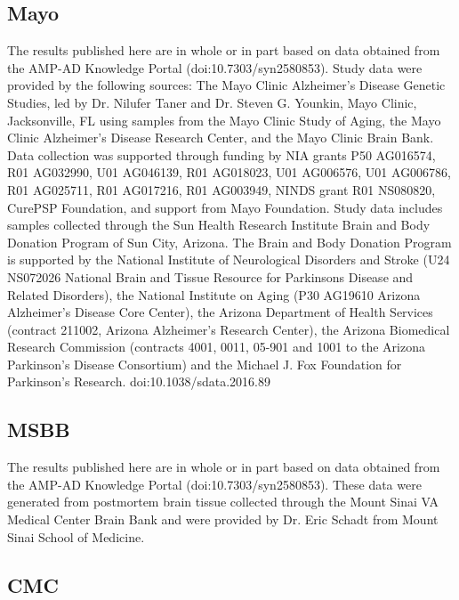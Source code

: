 \subsection*{Mayo}

The results published here are in whole or in part based on data obtained from the AMP-AD Knowledge Portal (doi:10.7303/syn2580853). Study data were provided by the following sources: The Mayo Clinic Alzheimer’s Disease Genetic Studies, led by Dr. Nilufer Taner and Dr. Steven G. Younkin, Mayo Clinic, Jacksonville, FL using samples from the Mayo Clinic Study of Aging, the Mayo Clinic Alzheimer’s Disease Research Center, and the Mayo Clinic Brain Bank. Data collection was supported through funding by NIA grants P50 AG016574, R01 AG032990, U01 AG046139, R01 AG018023, U01 AG006576, U01 AG006786, R01 AG025711, R01 AG017216, R01 AG003949, NINDS grant R01 NS080820, CurePSP Foundation, and support from Mayo Foundation. Study data includes samples collected through the Sun Health Research Institute Brain and Body Donation Program of Sun City, Arizona. The Brain and Body Donation Program is supported by the National Institute of Neurological Disorders and Stroke (U24 NS072026 National Brain and Tissue Resource for Parkinsons Disease and Related Disorders), the National Institute on Aging (P30 AG19610 Arizona Alzheimer’s Disease Core Center), the Arizona Department of Health Services (contract 211002, Arizona Alzheimer’s Research Center), the Arizona Biomedical Research Commission (contracts 4001, 0011, 05-901 and 1001 to the Arizona Parkinson's Disease Consortium) and the Michael J. Fox Foundation for Parkinson’s Research.  doi:10.1038/sdata.2016.89 


\subsection*{MSBB}
The results published here are in whole or in part based on data obtained from the AMP-AD Knowledge Portal (doi:10.7303/syn2580853). These data were generated from postmortem brain tissue collected through the Mount Sinai VA Medical Center Brain Bank and were provided by Dr. Eric Schadt from Mount Sinai School of Medicine. 

\subsection*{CMC}

